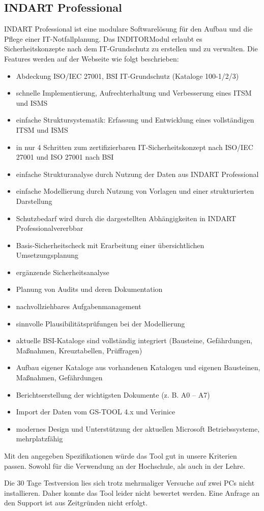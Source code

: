 \subsection{INDART Professional}
INDART Professional ist eine modulare Softwarelösung für den Aufbau und die Pflege einer IT-Notfallplanung. Das INDITOR\textregistered Modul erlaubt es Sicherheitskonzepte nach dem IT-Grundschutz zu erstellen und zu verwalten.
Die Features werden auf der Webseite \cite{indart} wie folgt beschrieben:

\begin{itemize}
\itemsep0em
\item Abdeckung ISO/IEC 27001, BSI IT-Grundschutz (Kataloge 100-1/2/3)
\item schnelle Implementierung, Aufrechterhaltung und Verbesserung eines ITSM und ISMS
\item einfache Struktursystematik: Erfassung und Entwicklung eines vollständigen ITSM und ISMS
\item in nur 4 Schritten zum zertifizierbaren IT-Sicherheitskonzept nach ISO/IEC 27001 und ISO 27001 nach BSI
\item einfache Strukturanalyse durch Nutzung der Daten aus INDART Professional\textregistered
\item einfache Modellierung durch Nutzung von Vorlagen und einer strukturierten Darstellung
\item Schutzbedarf wird durch die dargestellten Abhängigkeiten in INDART Professional\textregistered vererbbar
\item Basis-Sicherheitscheck mit Erarbeitung einer übersichtlichen Umsetzungsplanung
\item ergänzende Sicherheitsanalyse
\item Planung von Audits und deren Dokumentation
\item nachvollziehbares Aufgabenmanagement
\item sinnvolle Plausibilitätsprüfungen bei der Modellierung
\item aktuelle BSI-Kataloge sind vollständig integriert (Bausteine, Gefährdungen, Maßnahmen, Kreuztabellen, Prüffragen)
\item Aufbau eigener Kataloge aus vorhandenen Katalogen und eigenen Bausteinen, Maßnahmen, Gefährdungen
\item Berichtserstellung der wichtigsten Dokumente (z. B. A0 – A7)
\item Import der Daten vom GS-TOOL 4.x und Verinice
\item modernes Design und Unterstützung der aktuellen Microsoft Betriebssysteme, mehrplatzfähig
\end{itemize}

Mit den angegeben Spezifikationen würde das Tool gut in unsere Kriterien passen. Sowohl für die Verwendung an der Hochschule, als auch in der Lehre.

Die 30 Tage Testversion lies sich trotz mehrmaliger Versuche auf zwei PCs nicht installieren. Daher konnte das Tool leider nicht bewertet werden. Eine Anfrage an den Support ist aus Zeitgründen nicht erfolgt.